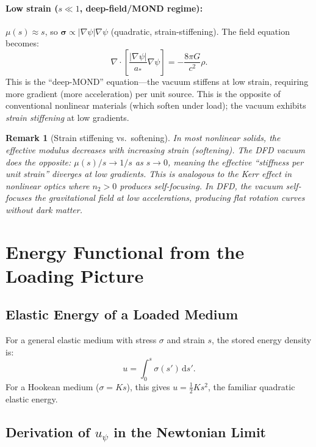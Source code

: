 \documentclass[11pt]{article}
\newtheorem{remark}[theorem]{Remark}
\newcommand{\dd}{\mathrm{d}}
\begin{document}
\paragraph{Low strain ($s \ll 1$, deep-field/MOND regime):}
$\mu(s) \approx s$, so $\bm{\sigma} \propto |\nabla\psi|\nabla\psi$ (quadratic, strain-stiffening).
The field equation becomes:
\begin{equation}
\nabla\cdot\left[\frac{|\nabla\psi|}{a_*}\nabla\psi\right]
= -\frac{8\pi G}{c^2}\rho.
\end{equation}
This is the ``deep-MOND'' equation---the vacuum stiffens at low strain,
requiring more gradient (more acceleration) per unit source.
This is the opposite of conventional nonlinear materials (which soften
under load); the vacuum exhibits \emph{strain stiffening} at low gradients.

\begin{remark}[Strain stiffening vs.\ softening]
In most nonlinear solids, the effective modulus decreases with increasing strain
(softening).  The DFD vacuum does the opposite: $\mu(s)/s \to 1/s$ as $s \to 0$,
meaning the effective ``stiffness per unit strain'' diverges at low gradients.
This is analogous to the Kerr effect in nonlinear optics where $n_2 > 0$
produces self-focusing.  In DFD, the vacuum self-focuses the gravitational
field at low accelerations, producing flat rotation curves without dark matter.
\end{remark}

\section{Energy Functional from the Loading Picture}
\label{sec:energy}

\subsection{Elastic Energy of a Loaded Medium}

For a general elastic medium with stress $\sigma$ and strain $s$,
the stored energy density is:
\begin{equation}
u = \int_0^s \sigma(s')\,\dd s'.
\end{equation}
For a Hookean medium ($\sigma = K s$), this gives $u = \frac{1}{2}K s^2$,
the familiar quadratic elastic energy.

\subsection{Derivation of $u_\psi$ in the Newtonian Limit}
\end{document}
